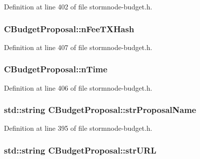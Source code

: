Definition at line 402 of file stormnode-\/budget.\+h.

\hypertarget{class_c_budget_proposal_aba9937f0c86385b04d0fd5eb136ce999}{}
\subsubsection[{n\+Fee\+T\+X\+Hash}]{ C\+Budget\+Proposal\+::n\+Fee\+T\+X\+Hash}\label{class_c_budget_proposal_aba9937f0c86385b04d0fd5eb136ce999}


Definition at line 407 of file stormnode-\/budget.\+h.

\hypertarget{class_c_budget_proposal_a73bbfda4189ae03fdecc3d6ddf984a42}{}
\subsubsection[{n\+Time}]{ C\+Budget\+Proposal\+::n\+Time}\label{class_c_budget_proposal_a73bbfda4189ae03fdecc3d6ddf984a42}


Definition at line 406 of file stormnode-\/budget.\+h.

\hypertarget{class_c_budget_proposal_ab881106333b75bf1a8c5c97d56cd6703}{}
\subsubsection[{str\+Proposal\+Name}]{\setlength{\rightskip}{0pt plus 5cm}std\+::string C\+Budget\+Proposal\+::str\+Proposal\+Name}\label{class_c_budget_proposal_ab881106333b75bf1a8c5c97d56cd6703}


Definition at line 395 of file stormnode-\/budget.\+h.

\hypertarget{class_c_budget_proposal_ac6ff1965ce0dca34221ec041ae831e83}{}
\subsubsection[{str\+U\+R\+L}]{\setlength{\rightskip}{0pt plus 5cm}std\+::string C\+Budget\+Proposal\+::str\+U\+R\+L}\label{class_c_budget_proposal_ac6ff1965ce0dca34221ec041ae831e83}



